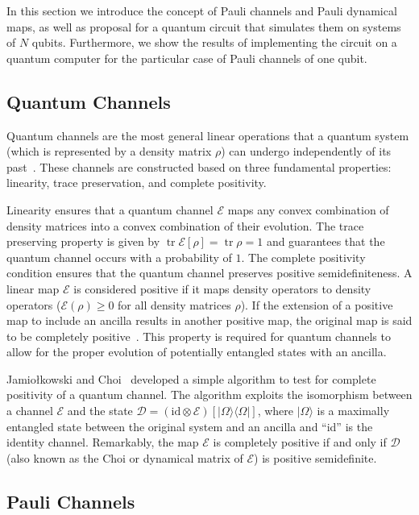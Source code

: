 \documentclass[10pt,letterpaper]{article}
\DeclareMathOperator{\tr}{tr}
\begin{document}
In this section we introduce the concept of Pauli channels and 
Pauli dynamical maps, as well as proposal for a quantum circuit that simulates them on systems of $N$ qubits. 
Furthermore, we show the results of implementing the circuit on a 
quantum computer for the particular case of Pauli channels of one qubit. 

\subsection*{Quantum Channels}
\label{subsec: Quantum Channels}
Quantum channels are the most general linear operations that a 
quantum system (which is represented by a density matrix $\rho$) 
can undergo independently of its past~\cite{zimansbook,cirac}. 
These channels are constructed based on three fundamental properties: 
linearity, trace preservation, and complete positivity.

Linearity ensures that a quantum channel $\mathcal{E}$ maps any convex combination 
of density matrices into a convex combination of their evolution. 
The trace preserving property is given by $\tr \mathcal{E}[\rho] = \tr \rho = 1$ 
and guarantees that the quantum channel occurs with a probability of $1$. 
The complete positivity condition ensures that the quantum channel preserves positive semidefiniteness. 
A linear map $\mathcal{E}$ is considered positive if it maps density operators to density operators 
($\mathcal{E}(\rho) \geq 0$  for all density matrices $\rho$). 
If the extension of a positive map to include an ancilla results in another positive map, 
the original map is said to be completely positive~\cite{geometry}. 
This property is required for quantum channels to allow for the
proper evolution of potentially entangled states with an ancilla.

Jamiołkowski and Choi~\cite{choi,jamil} developed a simple algorithm to test for 
complete positivity of a quantum channel. 
The algorithm exploits the isomorphism between a channel $\mathcal{E}$ and the 
state $\mathcal{D} = (\text{id} \otimes \mathcal{E}) [|\Omega \rangle \langle  \Omega|]$, 
where $|\Omega\rangle$ is a maximally entangled state between the original system and an 
ancilla and “id” is the identity channel. 
Remarkably, the map $\mathcal{E}$ is completely positive if and 
only if $\mathcal{D}$ (also known as the Choi or dynamical matrix of $\mathcal{E}$) is positive semidefinite.


\subsection*{Pauli Channels}
\label{subsec: Pauli Channels}
\end{document}
